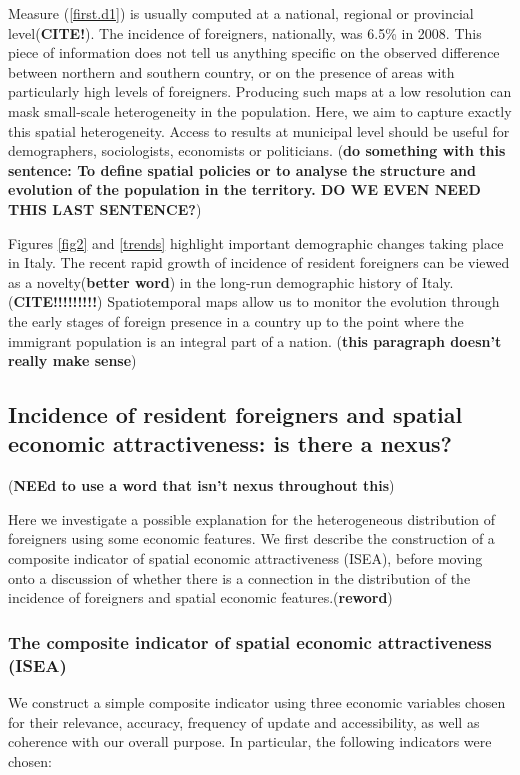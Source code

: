 \documentclass[10pt]{article}
\theoremstyle{definition}
\theoremstyle{plain}
\begin{document}
Measure (\ref{first.d1}) is usually computed at a national, regional or provincial level(\textbf{CITE!}). The incidence of foreigners, nationally, was 6.5\% in 2008. This piece of information does not tell us anything specific on the observed difference between northern and southern country, or on the presence of areas with particularly high levels of foreigners. Producing such maps at a low resolution can mask small-scale heterogeneity in the population. Here, we aim to capture exactly this spatial heterogeneity. Access to results at municipal level should be useful for demographers, sociologists, economists or politicians. (\textbf{do something with this sentence: To define spatial policies or to analyse the structure and evolution of the population in the territory. DO WE EVEN NEED THIS LAST SENTENCE?}) 

Figures \ref{fig2} and \ref{trends} highlight important demographic changes taking place in Italy. The recent rapid growth of incidence of resident foreigners can be viewed as a novelty(\textbf{better word}) in the long-run demographic history of Italy.(\textbf{CITE!!!!!!!!!}) Spatiotemporal maps allow us to monitor the evolution through the early stages of foreign presence in a country up to the point where the immigrant population is an integral part of a nation. (\textbf{this paragraph doesn't really make sense})

\subsection{Incidence of resident foreigners and spatial economic attractiveness: is there a nexus? \label{NEX}}

(\textbf{NEEd to use a word that isn't nexus throughout this})

Here we investigate a possible explanation for the heterogeneous distribution of foreigners using some economic features. We first describe the construction of a composite indicator of spatial economic attractiveness (ISEA), before moving onto a discussion of whether there is a connection in the distribution of the incidence of foreigners and spatial economic features.(\textbf{reword})

\subsubsection{The composite indicator of spatial economic attractiveness (ISEA) \label{ISEA}}

We construct a simple composite indicator using three economic variables chosen for their relevance, accuracy, frequency of update and accessibility, as well as coherence with our overall purpose. In particular, the following indicators were chosen:
\end{document}
